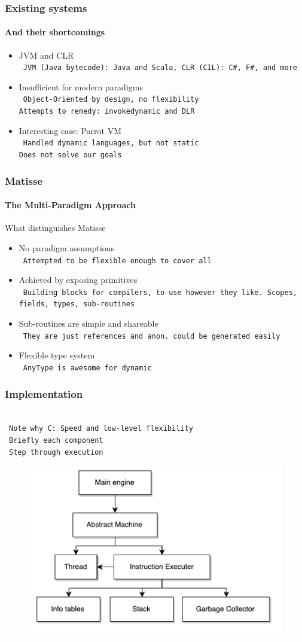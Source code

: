 \documentclass{beamer}
\newcommand{\n}[1]{\leavevmode\\~\texttt{\color{red}\tiny #1}}
\begin{document}
\begin{frame}
  \frametitle{Existing systems}
  \framesubtitle{And their shortcomings}

  \begin{itemize}
  \item JVM and CLR
    \n{JVM (Java bytecode): Java and Scala, CLR (CIL): C\#, F\#, and more}
  \item Insufficient for modern paradigms
    \n{Object-Oriented by design, no flexibility\\
       Attempts to remedy: {\tt invokedynamic} and DLR
    }
  \item Interesting case: Parrot VM
    \n{Handled dynamic languages, but not static\\
       Does not solve our goals
     }
  \end{itemize}
\end{frame}

\begin{frame}
  \frametitle{Matisse}
  \framesubtitle{The Multi-Paradigm Approach}

  What distinguishes Matisse
  \begin{itemize}[<+->]
  \item No paradigm assumptions
    \n{Attempted to be flexible enough to cover all}
  \item Achieved by exposing primitives
    \n{Building blocks for compilers, to use however they like. Scopes, fields, types, sub-routines}
  \item Sub-routines are simple and shareable
    \n{They are just references and anon. could be generated easily}
  \item Flexible type system
    \n{AnyType is awesome for dynamic}
  \end{itemize}
\end{frame}

\begin{frame}
  \frametitle{Implementation}

  \n{Note why C: Speed and low-level flexibility}
  \n{Briefly each component}
  \n{Step through execution}

  \begin{figure}[H]
    \centering
    \includegraphics[scale=0.5]{../figures/arch.pdf}
  \end{figure}
\end{frame}
\end{document}
